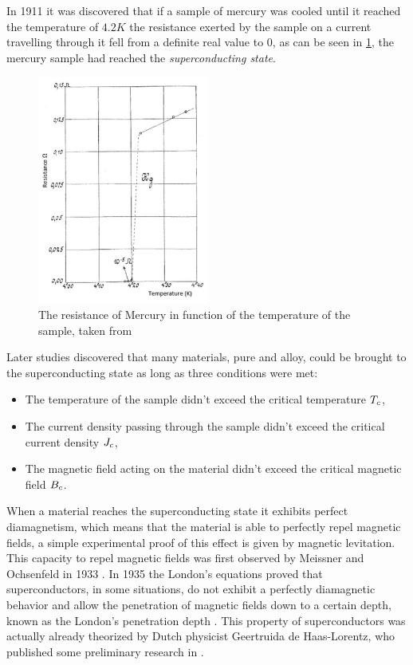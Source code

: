 In 1911 \cite{invention-superconductivity} it was discovered that if a sample of mercury was cooled
until it reached the temperature of $4.2K$ the resistance exerted by the sample on a current travelling
through it fell from a definite real value to $0$, as can be
seen in \cref{img:mercury-resistance}, the mercury sample had reached the \emph{superconducting
	state}.
\begin{figure}
	\centering
	\includegraphics[width=0.5\textwidth]{./img/mercury-resistance.png}
	\caption{The resistance of Mercury in function of the temperature of the sample, taken from
		\cite{tsukerman2020compendium}}
	\label{img:mercury-resistance}
\end{figure}

Later studies discovered that many materials, pure and alloy, could be brought to the
superconducting state as long as three conditions were met:
\begin{itemize}
	\item The temperature of the sample didn't exceed the critical temperature $T_c$,
	\item The current density passing through the sample didn't exceed the critical current
	      density $J_c$,
	\item The magnetic field acting on the material didn't exceed the critical magnetic field $B_c$.
\end{itemize}

When a material reaches the superconducting state it exhibits perfect diamagnetism, which means that
the material is able to perfectly repel magnetic fields, a simple experimental proof of this effect
is given by magnetic levitation. This capacity to repel magnetic fields was first observed by
Meissner and Ochsenfeld in 1933 \cite{meissner1933}. In 1935 the London's equations proved that
superconductors, in some situations, do not exhibit a perfectly diamagnetic behavior and allow the
penetration of magnetic fields down to a certain depth, known as the London's penetration depth
\cite{london1935}. This property of superconductors was actually already theorized by Dutch
physicist Geertruida de Haas-Lorentz, who published some preliminary research in
\cite{fokker1925physica}.

